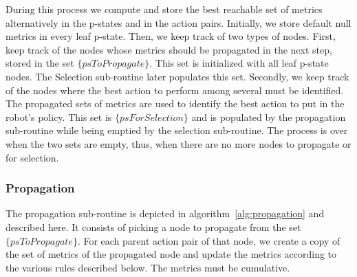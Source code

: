 During this process we compute and store the best reachable set of metrics alternatively in the p-states and in the action pairs. Initially, we store default null metrics in every leaf p-state. Then, we keep track of two types of nodes. First, keep track of the nodes whose metrics should be propagated in the next step, stored in the set $\{psToPropagate\}$. This set is initialized with all leaf p-state nodes. The Selection sub-routine later populates this set. Secondly, we keep track of the nodes where the best action to perform among several must be identified. The propagated sets of metrics are used to identify the best action to put in the robot's policy. This set is $\{psForSelection\}$ and is populated by the propagation sub-routine while being emptied by the selection sub-routine. The process is over when the two sets are empty, thus, when there are no more nodes to propagate or for selection.

    \subsubsection{Propagation}

The propagation sub-routine is depicted in algorithm~\ref{alg:propagation} and described here. It consists of picking a node to propagate from the set $\{psToPropagate\}$. For each parent action pair of that node, we create a copy of the set of metrics of the propagated node and update the metrics according to the various rules described below.
The metrics must be cumulative. 

